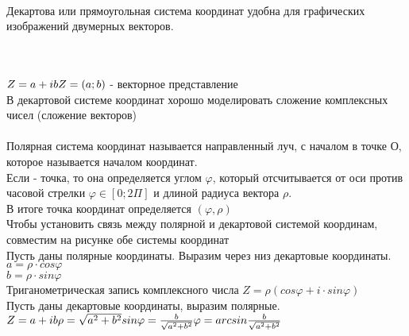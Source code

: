 \begin{center}
\\
\end{center}

Декартова или прямоугольная система координат удобна для
графических изображений двумерных векторов. \\
 \\
 \\


$Z = a + ib \\
Z = (a; b)$ - векторное представление \\
В декартовой системе координат хорошо моделировать сложение
комплексных чисел (сложение векторов) \\

 \\
Полярная система координат называется направленный луч, с
началом в точке \kv
{О}, которое называется началом координат. \\
Если  - точка, то она определяется углом $\varphi$,
который
отсчитывается от оси против часовой стрелки $\varphi \in [0;
2 \Pi]$ и длиной
радиуса вектора $\rho$. \\
В итоге точка координат определяется $(\varphi, \rho)$ \\

Чтобы установить связь между полярной и декартовой системой
координам, совместим на рисунке обе системы координат \\

Пусть даны полярные координаты. Выразим через низ декартовые
координаты. \\
$a = \rho \cdot cos\varphi$ \\
$b = \rho \cdot sin\varphi$ \\
Триганометрическая запись комплексного числа 
$Z = \rho (cos\varphi + i \cdot sin \varphi)$ \\
Пусть даны декартовые координаты, выразим полярные. \\
$Z = a + ib \\
\rho = \sqrt{a^2 + b^2} \\
sin \varphi = \frac {b}{\sqrt{a^2 + b^2}} \\
\varphi = arcsin \frac {b}{\sqrt{a^2 + b^2}}$ \\

